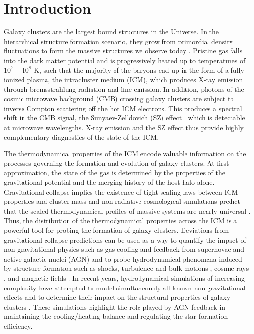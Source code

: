 \documentclass[traditabstract   ]{aa} %
\begin{document}
\section{Introduction}

Galaxy clusters are the largest bound structures in the Universe. In the hierarchical structure formation scenario, they grow from  primordial density fluctuations to form the massive structures we observe today  \citep[e.g.,][]{kravtsov12}. Pristine gas falls into the dark matter potential and is progressively heated up to temperatures of $10^7 - 10^8$ K, such that the majority of the baryons end up in the form of a fully ionized plasma, the intracluster medium (ICM), which produces X-ray emission through { bremsstrahlung} radiation and line emission. In addition, photons of the cosmic microwave background (CMB) crossing galaxy clusters are subject to inverse Compton scattering off the hot ICM electrons. This produces a spectral shift in the CMB signal, the Sunyaev-Zel'dovich (SZ) effect \citep{SZ}, which is detectable at microwave wavelengths. X-ray emission and the SZ effect thus provide highly complementary diagnostics of the state of the ICM.

The thermodynamical properties of the ICM encode valuable information on the processes governing the formation and evolution of galaxy clusters. At first approximation, the state of the gas is determined by the properties of the gravitational potential and the merging history of the host halo alone. Gravitational collapse implies the existence of tight scaling laws between ICM properties and cluster mass \citep[the self-similar model,][]{kaiser86,bryan98} and non-radiative cosmological simulations predict that the scaled thermodynamical profiles of massive systems are nearly universal \citep[e.g.,][]{frenk99,borgani05,voit05rev}. Thus, the distribution of the thermodynamical properties across the ICM is a powerful tool for probing the formation of galaxy clusters. Deviations from gravitational collapse predictions can be used as a way to quantify the impact of non-gravitational physics such as gas cooling and feedback from supernovae and active galactic nuclei (AGN) \citep{tozzi01,kay02,borgani04,kravtsov05,gaspari14} and to probe hydrodynamical phenomena induced by structure formation such as shocks, turbulence and bulk motions \citep{dolag05,rasia+06,vazza09,burns10}, cosmic rays \citep{pfrommer+07}, and magnetic fields \citep{dolag+99}. In recent years, hydrodynamical simulations of increasing complexity have attempted to model simultaneously all known non-gravitational effects and to determine their impact on the structural properties of galaxy clusters \citep[e.g.,][]{lebrun14,hahn17,planelles17,barnes17,gaspari18}. These simulations highlight the role played by AGN feedback in maintaining the cooling/heating balance and regulating the star formation efficiency.%
\end{document}
